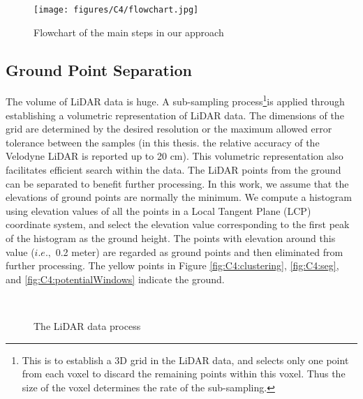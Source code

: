 \begin{figure}[H]
\centering
\texttt{[image: figures/C4/flowchart.jpg]} \\
\caption{Flowchart of the main steps in our approach} 
\label{fig:C4:flowchart}
\end{figure}

\subsection{Ground Point Separation}

The volume of LiDAR data is huge. A sub-sampling process\footnote{This is to establish a 3D grid in the LiDAR data, and selects only one point from each voxel to discard the remaining points within this voxel. Thus the size of the voxel determines the rate of the sub-sampling.}is applied through establishing a volumetric representation of LiDAR data. The dimensions of the grid are determined by the desired resolution or the maximum allowed error tolerance between the samples (in this thesis. the relative accuracy of the Velodyne LiDAR is reported up to 20 cm). This volumetric representation also facilitates efficient search within the data. The LiDAR points from the ground can be separated to benefit further processing. In this work, we assume that the elevations of ground points are normally the minimum. We compute a histogram using elevation values of all the points in a Local Tangent Plane (LCP) coordinate system, and select the elevation value corresponding to the first peak of the histogram as the ground height. The points with elevation around this value ($i.e.,$  0.2 meter) are regarded as ground points and then eliminated from further processing. The yellow points in Figure \ref{fig:C4:clustering}, \ref{fig:C4:seg}, and \ref{fig:C4:potentialWindows} indicate the ground.

\begin{figure}[H]
\centering
{} 
\hspace{.1in}
 \\

\caption{The LiDAR data process} 
\label{fig:C4:LiDAR_Process}
\end{figure}

